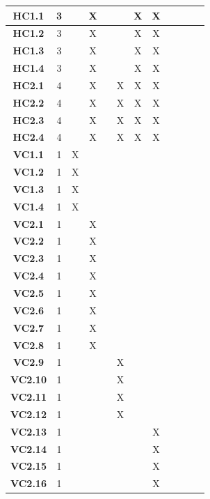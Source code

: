 \documentclass [10pt]{article}
\begin{document}
\begin{center}
\begin{tabularx} {.85\textwidth} {|c|c|c|c|c|c|c|c|c|c|c|c|}
 
\textbf{HC1.1}&3 & & X & & & X & X& & & &  \\ \hline
\textbf{HC1.2}&3 & & X & & & X & X& & & &  \\ \hline
\textbf{HC1.3}&3 & & X & & & X & X& & & &  \\ \hline
\textbf{HC1.4}&3 & & X & & & X & X& & & &  \\ \hline
\textbf{HC2.1}&4 & & X & & X & X & X& & & &  \\ \hline
\textbf{HC2.2}&4 & & X & & X & X & X& & & &  \\ \hline
\textbf{HC2.3}&4 & & X & & X & X & X& & & &  \\ \hline
\textbf{HC2.4}&4 & & X & & X & X & X& & & &  \\ \hline
\textbf{VC1.1}&1&X & & & & & & & & &    \\ \hline
\textbf{VC1.2}&1&X & & & & & & & & &     \\ \hline
\textbf{VC1.3}&1&X & & & & & & & & &     \\ \hline
\textbf{VC1.4}&1&X & & & & & & & & &     \\ \hline
\textbf{VC2.1}&1& & X& & & & & & & &     \\ \hline
\textbf{VC2.2}&1& & X& & & & & & & &     \\ \hline
\textbf{VC2.3}&1& & X& & & & & & & &     \\ \hline
\textbf{VC2.4}&1& & X& & & & & & & &     \\ \hline
\textbf{VC2.5}&1& & X& & & & & & & &     \\ \hline
\textbf{VC2.6}&1& & X& & & & & & & &     \\ \hline
\textbf{VC2.7}&1& & X& & & & & & & &     \\ \hline
\textbf{VC2.8}&1& & X& & & & & & & &     \\ \hline
\textbf{VC2.9}&1& & & & X& & & & & &     \\ \hline
\textbf{VC2.10}&1& & & & X& & & & & &     \\ \hline
\textbf{VC2.11}&1& & & & X& & & & & &     \\ \hline
\textbf{VC2.12}&1& & & & X& & & & & &    \\ \hline
\textbf{VC2.13}&1& & & & & & X & & & &     \\ \hline
\textbf{VC2.14}&1& & & & & & X & & & &    \\ \hline
\textbf{VC2.15}&1& & & & & & X & & & &     \\ \hline
\textbf{VC2.16}&1& & & & & & X & & & &     \\ \hline

\end{tabularx}
\end{center}
\end{document}
